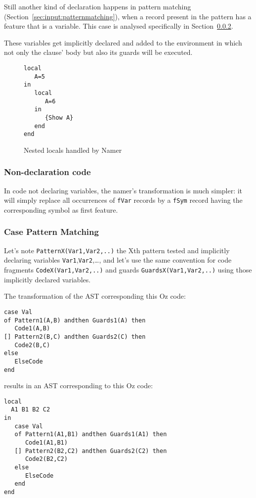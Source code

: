\documentclass[a4paper]{memoir}
\begin{document}
Still another kind of declaration happens in pattern matching
(Section~\ref{sec:input:patternmatching}), when a record present in the pattern
has a feature that is a variable. This case is analysed specifically in
Section~\ref{sec:arch:namer:patternmatching}.

These variables get implicitly declared and added to the environment in which not only the clause' body but also its guards will be executed.


\begin{figure}
\begin{lstlisting}
local
   A=5
in
   local 
      A=6
   in
      {Show A}
   end
end
\end{lstlisting}
\caption{Nested locals handled by Namer}
\label{fig:namer_nested_locals}
\end{figure}


\subsubsection{Non-declaration code}
In code not declaring variables, the namer's transformation is much simpler: it will simply
replace all occurrences of \lstinline!fVar! records by a \lstinline!fSym! record having the corresponding symbol as first feature.


\subsubsection{Case Pattern Matching}\label{sec:arch:namer:patternmatching}
 Let's note
\lstinline!PatternX(Var1,Var2,..)! the Xth pattern tested and implicitly
declaring variables \lstinline!Var1!,\lstinline!Var2!,\ldots, and let's use the same convention for code fragments \lstinline!CodeX(Var1,Var2,..)! and guards \lstinline!GuardsX(Var1,Var2,..)! using those implicitly declared variables.

The transformation of the AST corresponding this Oz code:
\begin{lstlisting}
case Val
of Pattern1(A,B) andthen Guards1(A) then
   Code1(A,B)
[] Pattern2(B,C) andthen Guards2(C) then
   Code2(B,C)
else
   ElseCode
end
\end{lstlisting}
results in an AST corresponding to this Oz code:
\begin{lstlisting}
local
  A1 B1 B2 C2
in
   case Val
   of Pattern1(A1,B1) andthen Guards1(A1) then
      Code1(A1,B1)
   [] Pattern2(B2,C2) andthen Guards2(C2) then
      Code2(B2,C2)
   else
      ElseCode
   end
end
\end{lstlisting}
\end{document}
